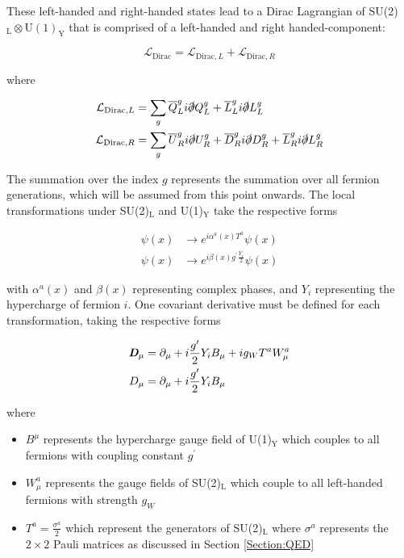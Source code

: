 \documentclass[12pt,a4paper,epsf,portrait,times,epsfig]{report}
\begin{document}
	These left-handed and right-handed states lead to a Dirac Lagrangian of SU(2)$_{\mathrm{L}} \otimes \mathrm{U(1)}_{\mathrm{Y}}$ that is comprised of a left-handed and right handed-component:
	
	\begin{equation}
		\mathcal{L}_{\mathrm{Dirac}} = \mathcal{L}_{\mathrm{Dirac},L} + \mathcal{L}_{\mathrm{Dirac},R}
	\end{equation}

	where

	\begin{align}
		\mathcal{L}_{\mathrm{Dirac},L}&=\sum_{g}\overline{Q}_{L}^{g}i\slashed{\partial}Q_{L}^{g}+\overline{L}_{L}^{g}i\slashed{\partial}L_{L}^{g} \\
		\mathcal{L}_{\mathrm{Dirac},R}&=\sum_{g}\overline{U}_{R}^{g}i\slashed{\partial}U_{R}^{g}+\overline{D}_{R}^{g}i\slashed{\partial}D_{R}^{g}+\overline{L}_{R}^{g}i\slashed{\partial}L_{R}^{g} 
	\end{align}

	The summation over the index $g$ represents the summation over all fermion generations, which will be assumed from this point onwards. The local transformations under SU(2)$_{\mathrm{L}}$ and U(1)$_{\mathrm{Y}}$ take the respective forms

	\begin{align}
		\psi(x) &\rightarrow e^{i\alpha^{a}(x)T^{a}}\psi(x) \\
		\psi(x) &\rightarrow e^{i\beta(x)g^{\prime}\frac{Y_{i}}{2}}\psi(x)
	\end{align}

	with $\alpha^{a}(x)$ and $\beta(x)$ representing complex phases, and $Y_{i}$ representing the hypercharge of fermion $i$. One covariant derivative must be defined for each transformation, taking the respective forms

	\begin{align}
		\textit{\textbf{D}}_{\mu} &= \partial_{\mu} + i\frac{g^{\prime}}{2}Y_{i}B_{\mu}+ig_{W}T^{a}W_{\mu}^{a} \\
		D_{\mu} &= \partial_{\mu} + i\frac{g^{\prime}}{2}Y_{i}B_{\mu} 	
	\end{align}

	where

	\begin{itemize}
		\item $B^{\mu}$ represents the hypercharge gauge field of U(1)$_{\mathrm{Y}}$ which couples to all fermions with coupling constant $g^{\prime}$
		\item $W_{\mu}^{a}$ represents the gauge fields of SU(2)$_{\mathrm{L}}$ which couple to all left-handed fermions with strength $g_{W}$
		\item $T^{a}=\frac{\sigma^{a}}{2}$ which represent the generators of SU(2)$_{\mathrm{L}}$ where $\sigma^{a}$ represents the $2 \times 2$ Pauli matrices as discussed in Section \ref{Section:QED}
	\end{itemize}
\end{document}
